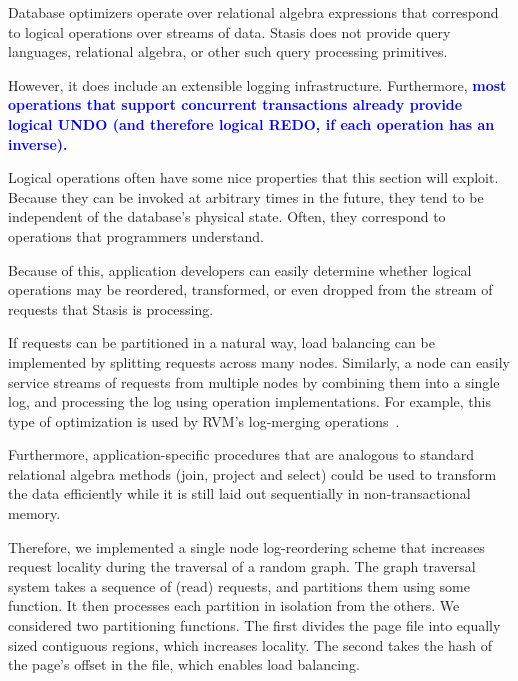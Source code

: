 \documentclass[letterpaper,twocolumn,10pt]{article}
\newcommand{\yad}{Stasis\xspace}
\newcommand{\diff}[1]{\textcolor{blue}{\bf #1}}
\begin{document}
Database optimizers operate over relational algebra expressions that
correspond to logical operations over streams of data.  \yad
does not provide query languages, relational algebra, or other such query processing primitives.  

However, it does include an extensible logging infrastructure.
Furthermore, \diff{most operations that support concurrent transactions already
provide logical UNDO (and therefore logical REDO, if each operation has an
inverse).}

Logical operations often have some nice properties that this section
will exploit.  Because they can be invoked at arbitrary times in the
future, they tend to be independent of the database's physical state.
Often, they correspond to operations that programmers understand.

Because of this, application developers can easily determine whether
logical operations may be reordered, transformed, or even
dropped from the stream of requests that \yad is processing.

If requests can be partitioned in a natural way, load
balancing can be implemented by splitting requests across many nodes.
Similarly, a node can easily service streams of requests from multiple
nodes by combining them into a single log, and processing the log
using operation implementations.  For example, this type of optimization 
is used by RVM's log-merging operations~\cite{lrvm}.

Furthermore, application-specific
procedures that are analogous to standard relational algebra methods
(join, project and select) could be used to transform the data efficiently
while it is still laid out sequentially
in non-transactional memory.


Therefore, we implemented a single node log-reordering scheme that increases request locality
during the traversal of a random graph.  The graph traversal system
takes a sequence of (read) requests, and partitions them using some
function.  It then processes each partition in isolation from the
others.  We considered two partitioning functions.  The first divides the page file
into equally sized contiguous regions, which increases locality.  The second takes the hash
of the page's offset in the file, which enables load balancing.
\end{document}

